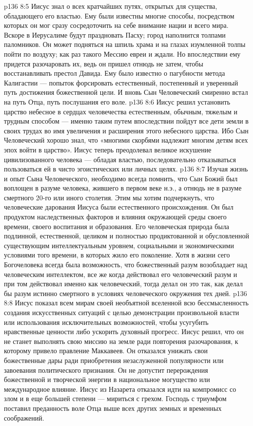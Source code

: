 \vs p136 8:5 Иисус знал о всех кратчайших путях, открытых для существа, обладающего его властью. Ему были известны многие способы, посредством которых он мог сразу сосредоточить на себе внимание нации и всего мира. Вскоре в Иерусалиме будут праздновать Пасху; город наполнится толпами паломников. Он может подняться на шпиль храма и на глазах изумленной толпы пойти по воздуху; как раз такого Мессию евреи и ждали. Но впоследствии ему придется разочаровать их, ведь он пришел отнюдь не затем, чтобы восстанавливать престол Давида. Ему было известно о пагубности метода Калигастии --- попыток форсировать естественный, постепенный и уверенный путь достижения божественной цели. И вновь Сын Человеческий смиренно встал на путь Отца, путь послушания его воле.
\vs p136 8:6 Иисус решил установить царство небесное в сердцах человечества естественным, обычным, тяжелым и трудным способом --- именно таким путем впоследствии пойдут все дети земли в своих трудах во имя увеличения и расширения этого небесного царства. Ибо Сын Человеческий хорошо знал, что «многими скорбями надлежит многим детям всех эпох войти в царство». Иисус теперь преодолевал великое искушение цивилизованного человека --- обладая властью, последовательно отказываться пользоваться ей в чисто эгоистических или личных целях.
\vs p136 8:7 \pc Изучая жизнь и опыт Сына Человеческого, необходимо всегда помнить, что Сын Божий был воплощен в разуме человека, жившего в первом веке н.э., а отнюдь не в разуме смертного 20\hyp{}го или иного столетия. Этим мы хотим подчеркнуть, что человеческие дарования Иисуса были естественного происхождения. Он был продуктом наследственных факторов и влияния окружающей среды своего времени, своего воспитания и образования. Его человеческая природа была подлинной, естественной, целиком и полностью продиктованной и обусловленной существующим интеллектуальным уровнем, социальными и экономическими условиями того времени, в которых жило его поколение. Хотя в жизни сего Богочеловека всегда была возможность, что божественный разум возобладает над человеческим интеллектом, все же когда действовал его человеческий разум и при том действовал именно как человеческий, тогда делал он это так, как делал бы разум истинно смертного в условиях человеческого окружения тех дней.
\vs p136 8:8 \pc Иисус показал всем мирам своей необъятной вселенной всю бессмысленность создания искусственных ситуаций с целью демонстрации произвольной власти или использования исключительных возможностей, чтобы усугубить нравственные ценности либо ускорить духовный прогресс. Иисус решил, что он не станет выполнять свою миссию на земле ради повторения разочарования, к которому привело правление Маккавеев. Он отказался унижать свои божественные дары ради приобретения незаслуженной популярности или завоевания политического признания. Он не допустит перерождения божественной и творческой энергии в национальное могущество или международное влияние. Иисус из Назарета отказался идти на компромисс со злом и в еще большей степени --- мириться с грехом. Господь с триумфом поставил преданность воле Отца выше всех других земных и временных соображений.
